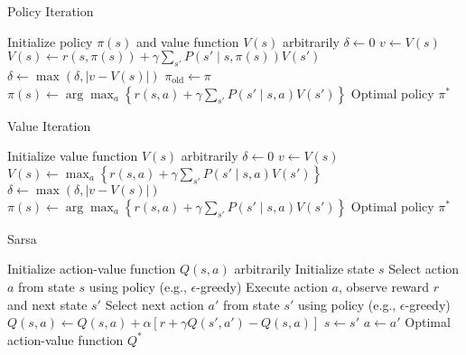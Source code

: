 \documentclass{article}
\begin{document}
\begin{algorithm}
\caption{Policy Iteration}
\begin{algorithmic}[1]
\Require Initialize policy $\pi(s)$ and value function $V(s)$ arbitrarily
\Repeat
    \While{$\delta > \theta$}
        \State $\delta \gets 0$
            \State $v \gets V(s)$
            \State $V(s) \gets r(s, \pi(s)) + \gamma \sum_{s'} P(s' \mid s, \pi(s)) V(s')$
            \State $\delta \gets \max(\delta, |v - V(s)|)$
        \EndFor
    \EndWhile
    \State $\pi_{\text{old}} \gets \pi$
        \State $\pi(s) \gets \arg\max_{a} \left\{r(s, a) + \gamma \sum_{s'} P(s' \mid s, a) V(s')\right\}$
    \EndFor
{}
\State \Return Optimal policy $\pi^*$
\end{algorithmic}
\end{algorithm}

\begin{algorithm}
\caption{Value Iteration}
\begin{algorithmic}[1]
\Require Initialize value function $V(s)$ arbitrarily
\Repeat
    \State $\delta \gets 0$
        \State $v \gets V(s)$
        \State $V(s) \gets \max_{a} \left\{r(s, a) + \gamma \sum_{s'} P(s' \mid s, a) V(s')\right\}$
        \State $\delta \gets \max(\delta, |v - V(s)|)$
    \EndFor
\Until{$\delta < \theta$}
    \State $\pi(s) \gets \arg\max_{a} \left\{r(s, a) + \gamma \sum_{s'} P(s' \mid s, a) V(s')\right\}$
\EndFor
\State \Return Optimal policy $\pi^*$
\end{algorithmic}
\end{algorithm}

\begin{algorithm}
\caption{Sarsa}
\begin{algorithmic}[1]
\Require Initialize action-value function $Q(s, a)$ arbitrarily
\Repeat
    \State Initialize state $s$
    \State Select action $a$ from state $s$ using policy (e.g., $\epsilon$-greedy)
    \Repeat
        \State Execute action $a$, observe reward $r$ and next state $s'$
        \State Select next action $a'$ from state $s'$ using policy (e.g., $\epsilon$-greedy)
        \State $Q(s, a) \gets Q(s, a) + \alpha \left[r + \gamma Q(s', a') - Q(s, a)\right]$
        \State $s \gets s'$
        \State $a \gets a'$
\State \Return Optimal action-value function $Q^*$
\end{algorithmic}
\end{algorithm}
\end{document}
